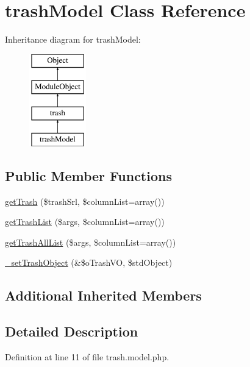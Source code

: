 \hypertarget{classtrashModel}{\section{trash\-Model Class Reference}
\label{classtrashModel}
}
Inheritance diagram for trash\-Model\-:\begin{figure}[H]
\begin{center}
\leavevmode
\includegraphics[height=4.000000cm]{classtrashModel}
\end{center}
\end{figure}
\subsection*{Public Member Functions}
\begin{DoxyCompactItemize}
\item 
\hyperlink{classtrashModel_ac0f5e5599f150c464bc0d96063ed632f}{get\-Trash} (\$trash\-Srl, \$column\-List=array())
\item 
\hyperlink{classtrashModel_a0b375cfc47cac28e3b7d7fd8555483fc}{get\-Trash\-List} (\$args, \$column\-List=array())
\item 
\hyperlink{classtrashModel_aad709b5f33dfed12c179dd1582b3e507}{get\-Trash\-All\-List} (\$args, \$column\-List=array())
\item 
\hyperlink{classtrashModel_af410c03d8545197837e381ecce862a7c}{\-\_\-set\-Trash\-Object} (\&\$o\-Trash\-V\-O, \$std\-Object)
\end{DoxyCompactItemize}
\subsection*{Additional Inherited Members}


\subsection{Detailed Description}


Definition at line 11 of file trash.\-model.\-php.



